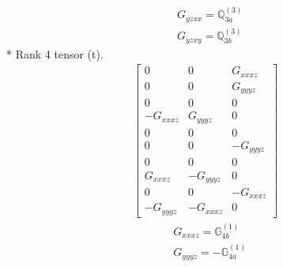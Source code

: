 \documentclass[fleqn,8pt,landscape]{jsarticle}
\begin{document}
\begin{align*}
& G_{yzxx} = \mathbb{Q}_{3a}^{(3)} \\
& G_{yzxy} = \mathbb{Q}_{3b}^{(3)}
\end{align*}
* Rank 4 tensor (t).
\begin{align*}
\begin{bmatrix} 0 & 0 & G_{xxxz} \\ 0 & 0 & G_{yyyz} \\ 0 & 0 & 0 \\ - G_{xxxz} & G_{yyyz} & 0 \\ 0 & 0 & 0 \\ 0 & 0 & - G_{yyyz} \\ 0 & 0 & 0 \\ G_{xxxz} & - G_{yyyz} & 0 \\ 0 & 0 & - G_{xxxz} \\ - G_{yyyz} & - G_{xxxz} & 0 \end{bmatrix}
\end{align*}
\begin{align*}
& G_{xxxz} = \mathbb{G}_{4b}^{(1)} \\
& G_{yyyz} = - \mathbb{G}_{4a}^{(1)}
\end{align*}
\end{document}

